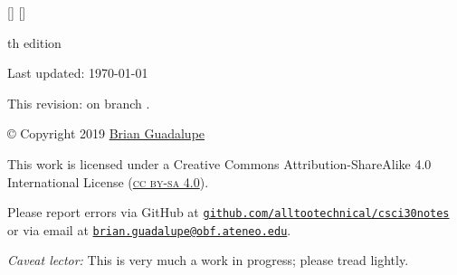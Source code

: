 \thispagestyle{empty}
[\head]
\StrBehind[2]{\head}{/}[\branch]

\vspace*{\fill}
\begin{center}
\begin{minipage}{0.5\textwidth}
\begin{center}
\small
\textonehalf th edition

Last updated: \today

\vspace{0.5cm}
This revision: \href{https://github.com/alltootechnical/csci30notes/commit/\commit}{\texttt{\commit}} on branch \href{https://github.com/alltootechnical/csci30notes/tree/\branch}{\texttt{\branch}}.
\vspace{1cm}

\copyright{} Copyright 2019 \href{http://penoy.admu.edu.ph/~guadalupe154884/}{Brian Guadalupe}

\vspace{0.5cm}
\ccbysa

This work is licensed under a Creative Commons Attribution-ShareAlike 4.0 International License (\href{http://creativecommons.org/licenses/by-sa/4.0/}{\textsc{cc by-sa 4.0}}).

\vspace{1cm}
Please report errors via GitHub at \href{https://github.com/alltootechnical/csci30notes/issues}{\texttt{github.com/alltootechnical/csci30notes}} or via email at \href{mailto:brian.guadalupe+csci30notes@obf.ateneo.edu}{\texttt{brian.guadalupe@obf.ateneo.edu}}.

\vspace{0.5cm}
\textit{Caveat lector:} This is very much a work in progress; please tread lightly.

\end{center}
\end{minipage}
\end{center}
